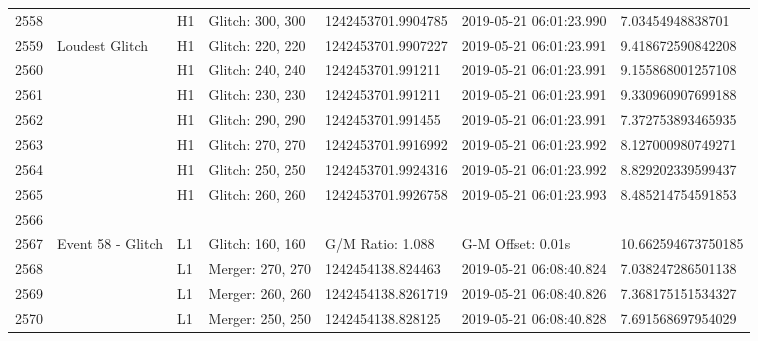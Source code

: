 \begin{longtable}{lllllll}
2558 &                                                    &       H1 &  Glitch: 300, 300 &  1242453701.9904785 &  2019-05-21 06:01:23.990 &    7.03454948838701 \\
2559 &                                     Loudest Glitch &       H1 &  Glitch: 220, 220 &  1242453701.9907227 &  2019-05-21 06:01:23.991 &   9.418672590842208 \\
2560 &                                                    &       H1 &  Glitch: 240, 240 &   1242453701.991211 &  2019-05-21 06:01:23.991 &   9.155868001257108 \\
2561 &                                                    &       H1 &  Glitch: 230, 230 &   1242453701.991211 &  2019-05-21 06:01:23.991 &   9.330960907699188 \\
2562 &                                                    &       H1 &  Glitch: 290, 290 &   1242453701.991455 &  2019-05-21 06:01:23.991 &   7.372753893465935 \\
2563 &                                                    &       H1 &  Glitch: 270, 270 &  1242453701.9916992 &  2019-05-21 06:01:23.992 &   8.127000980749271 \\
2564 &                                                    &       H1 &  Glitch: 250, 250 &  1242453701.9924316 &  2019-05-21 06:01:23.992 &   8.829202339599437 \\
2565 &                                                    &       H1 &  Glitch: 260, 260 &  1242453701.9926758 &  2019-05-21 06:01:23.993 &   8.485214754591853 \\
2566 &                                                    &          &                   &                     &                          &                     \\
2567 &                                  Event 58 - Glitch &       L1 &  Glitch: 160, 160 &    G/M Ratio: 1.088 &        G-M Offset: 0.01s &  10.662594673750185 \\
2568 &                                                    &       L1 &  Merger: 270, 270 &   1242454138.824463 &  2019-05-21 06:08:40.824 &   7.038247286501138 \\
2569 &                                                    &       L1 &  Merger: 260, 260 &  1242454138.8261719 &  2019-05-21 06:08:40.826 &   7.368175151534327 \\
2570 &                                                    &       L1 &  Merger: 250, 250 &   1242454138.828125 &  2019-05-21 06:08:40.828 &   7.691568697954029 \\

\end{longtable}
